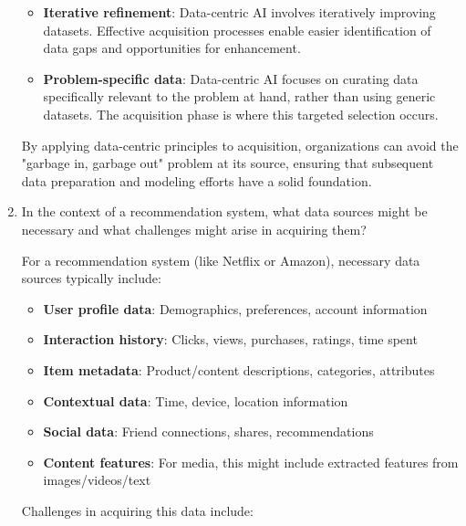 \documentclass[12pt]{article}
\begin{document}
\begin{enumerate}
\begin{tcolorbox}[colback=blue!5!white,colframe=blue!75!black,title=Solution]
\begin{itemize}
        \item \textbf{Iterative refinement}: Data-centric AI involves iteratively improving datasets. Effective acquisition processes enable easier identification of data gaps and opportunities for enhancement.
        
        \item \textbf{Problem-specific data}: Data-centric AI focuses on curating data specifically relevant to the problem at hand, rather than using generic datasets. The acquisition phase is where this targeted selection occurs.
    \end{itemize}
    
    By applying data-centric principles to acquisition, organizations can avoid the "garbage in, garbage out" problem at its source, ensuring that subsequent data preparation and modeling efforts have a solid foundation.
    \end{tcolorbox}
    
    \item In the context of a recommendation system, what data sources might be necessary and what challenges might arise in acquiring them?
    
    \begin{tcolorbox}[colback=blue!5!white,colframe=blue!75!black,title=Solution]
    For a recommendation system (like Netflix or Amazon), necessary data sources typically include:
    
    \begin{itemize}
        \item \textbf{User profile data}: Demographics, preferences, account information
        \item \textbf{Interaction history}: Clicks, views, purchases, ratings, time spent
        \item \textbf{Item metadata}: Product/content descriptions, categories, attributes
        \item \textbf{Contextual data}: Time, device, location information
        \item \textbf{Social data}: Friend connections, shares, recommendations
        \item \textbf{Content features}: For media, this might include extracted features from images/videos/text
    \end{itemize}
    
    Challenges in acquiring this data include:
    

\end{tcolorbox}
\end{enumerate}
\end{document}
